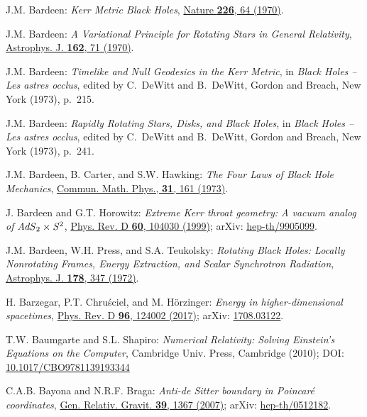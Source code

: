 \begin{thebibliography}{123}
J.M. Bardeen:
{\em Kerr Metric Black Holes},
\href{https://doi.org/10.1038/226064a0}{Nature {\bf 226}, 64 (1970)}.

J.M. Bardeen:
{\em A Variational Principle for Rotating Stars in General Relativity},
\href{https://doi.org/10.1086/150635}{Astrophys. J. {\bf  162}, 71 (1970)}.

J.M. Bardeen:
{\em Timelike and Null Geodesics in the Kerr Metric},
in {\em Black Holes -- Les astres occlus},  edited by C.~DeWitt and B.~DeWitt,
Gordon and Breach, New York (1973), p.~215.

J.M. Bardeen:
{\em Rapidly Rotating Stars, Disks, and Black Holes},
in {\em Black Holes -- Les astres occlus},  edited by C.~DeWitt and B.~DeWitt,
Gordon and Breach, New York (1973), p.~241.

J.M. Bardeen, B. Carter, and S.W. Hawking:
{\em The Four Laws of Black Hole Mechanics},
\href{https://doi.org/10.1007/BF01645742}{Commun. Math. Phys., {\bf 31}, 161 (1973)}.

J. Bardeen and G.T. Horowitz:
{\em Extreme Kerr throat geometry: A vacuum analog of ${\it AdS}_2\times{\it S}^2$},
\href{https://doi.org/10.1103/PhysRevD.60.104030}{Phys. Rev. D {\bf 60}, 104030 (1999)};
arXiv: \href{https://arxiv.org/abs/hep-th/9905099}{hep-th/9905099}.

J.M. Bardeen, W.H. Press, and S.A. Teukolsky:
{\em Rotating Black Holes: Locally Nonrotating Frames, Energy Extraction, and Scalar Synchrotron Radiation},
\href{https://doi.org/10.1086/151796}{Astrophys. J. {\bf  178}, 347 (1972)}.

H. Barzegar, P.T. Chruściel, and M. Hörzinger:
{\em Energy in higher-dimensional spacetimes},
\href{https://doi.org/10.1103/PhysRevD.96.124002}{Phys. Rev. D {\bf 96}, 124002 (2017)};
arXiv: \href{https://arxiv.org/abs/1708.03122}{1708.03122}.

T.W. Baumgarte and S.L. Shapiro:
{\em Numerical Relativity: Solving Einstein's Equations on the Computer},
Cambridge Univ. Press, Cambridge (2010);
DOI: \href{https://doi.org/10.1017/CBO9781139193344}{10.1017/CBO9781139193344}

C.A.B. Bayona and N.R.F. Braga:
{\em Anti-de Sitter boundary in Poincaré coordinates},
\href{https://doi.org/10.1007/s10714-007-0446-y}{Gen. Relativ. Gravit. {\bf 39}, 1367 (2007)};
arXiv: \href{https://arxiv.org/abs/hep-th/0512182}{hep-th/0512182}.


\end{thebibliography}
